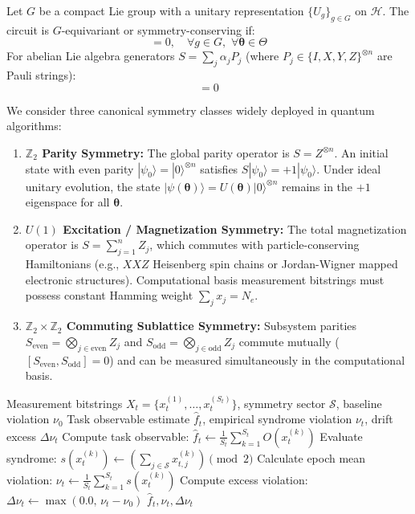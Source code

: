 \documentclass[aps,pra,twocolumn,superscriptaddress,10pt,floatfix]{revtex4-2}
\begin{document}
Let $G$ be a compact Lie group with a unitary representation $\{U_g\}_{g \in G}$ on $\mathcal{H}$. The circuit is $G$-equivariant or symmetry-conserving if:
\begin{equation}
[U(\boldsymbol{\theta}), U_g] = 0, \quad \forall g \in G, \,\, \forall \boldsymbol{\theta} \in \Theta
\end{equation}
For abelian Lie algebra generators $S = \sum_j \alpha_j P_j$ (where $P_j \in \{I, X, Y, Z\}^{\otimes n}$ are Pauli strings):
\begin{equation}
[U(\boldsymbol{\theta}), S] = 0
\end{equation}

We consider three canonical symmetry classes widely deployed in quantum algorithms:
\begin{enumerate}
    \item \textbf{$\mathbb{Z}_2$ Parity Symmetry:} The global parity operator is $S = Z^{\otimes n}$. An initial state with even parity $|\psi_0\rangle = |0\rangle^{\otimes n}$ satisfies $S |\psi_0\rangle = +1 |\psi_0\rangle$. Under ideal unitary evolution, the state $|\psi(\boldsymbol{\theta})\rangle = U(\boldsymbol{\theta}) |0\rangle^{\otimes n}$ remains in the $+1$ eigenspace for all $\boldsymbol{\theta}$.
    \item \textbf{$U(1)$ Excitation / Magnetization Symmetry:} The total magnetization operator is $S = \sum_{j=1}^n Z_j$, which commutes with particle-conserving Hamiltonians (e.g., $XXZ$ Heisenberg spin chains or Jordan-Wigner mapped electronic structures). Computational basis measurement bitstrings must possess constant Hamming weight $\sum_j x_j = N_e$.
    \item \textbf{$\mathbb{Z}_2 \times \mathbb{Z}_2$ Commuting Sublattice Symmetry:} Subsystem parities $S_{\mathrm{even}} = \bigotimes_{j \in \mathrm{even}} Z_j$ and $S_{\mathrm{odd}} = \bigotimes_{j \in \mathrm{odd}} Z_j$ commute mutually ($[S_{\mathrm{even}}, S_{\mathrm{odd}}] = 0$) and can be measured simultaneously in the computational basis.
\end{enumerate}

\begin{algorithm}[t]
\caption{Zero-Cost Free Symmetry Syndrome Extraction}
\label{alg:syndrome}
\begin{algorithmic}[1]
\Require Measurement bitstrings $X_t = \{x_t^{(1)}, \dots, x_t^{(S_t)}\}$, symmetry sector $\mathcal{S}$, baseline violation $\nu_0$
\Ensure Task observable estimate $\hat{f}_t$, empirical syndrome violation $\nu_t$, drift excess $\Delta \nu_t$
\State Compute task observable: $\hat{f}_t \gets \frac{1}{S_t} \sum_{k=1}^{S_t} O(x_t^{(k)})$ 
    \State Evaluate syndrome: $s(x_t^{(k)}) \gets \left( \sum_{j \in \mathcal{S}} x_{t, j}^{(k)} \right) \pmod 2$ 
\EndFor
\State Calculate epoch mean violation: $\nu_t \gets \frac{1}{S_t} \sum_{k=1}^{S_t} s(x_t^{(k)})$
\State Compute excess violation: $\Delta \nu_t \gets \max(0.0, \, \nu_t - \nu_0)$
\State \Return $\hat{f}_t, \nu_t, \Delta \nu_t$
\end{algorithmic}
\end{algorithm}
\end{document}
